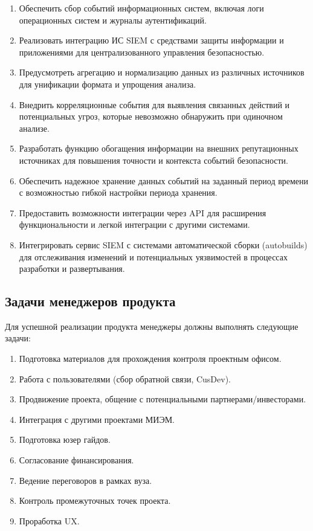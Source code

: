 \documentclass[14pt, a4paper]{extarticle}
\begin{document}
\begin{enumerate}
\item Обеспечить сбор событий информационных систем, включая логи операционных систем и журналы аутентификаций.
\item Реализовать интеграцию ИС SIEM с средствами защиты информации и приложениями для централизованного управления безопасностью.
\item Предусмотреть агрегацию и нормализацию данных из различных источников для унификации формата и упрощения анализа.
\item Внедрить корреляционные события для выявления связанных действий и потенциальных угроз, которые невозможно обнаружить при одиночном анализе.
\item Разработать функцию обогащения информации на внешних репутационных источниках для повышения точности и контекста событий безопасности.
\item Обеспечить надежное хранение данных событий на заданный период времени с возможностью гибкой настройки периода хранения.
\item Предоставить возможности интеграции через API для расширения функциональности и легкой интеграции с другими системами.
\item Интегрировать сервис SIEM с системами автоматической сборки (autobuilds) для отслеживания изменений и потенциальных уязвимостей в процессах разработки и развертывания.
\end{enumerate}

\subsection{Задачи менеджеров продукта}

Для успешной реализации продукта менеджеры должны выполнять следующие задачи:

\begin{enumerate}
\item Подготовка материалов для прохождения контроля проектным офисом.
\item Работа с пользователями (сбор обратной связи, CusDev).
\item Продвижение проекта, общение с потенциальными партнерами/инвесторами.
\item Интеграция с другими проектами МИЭМ.
\item Подготовка юзер гайдов.
\item Согласование финансирования.
\item Ведение переговоров в рамках вуза.
\item Контроль промежуточных точек проекта.
\item Проработка UX.
\end{enumerate}
\end{document}
